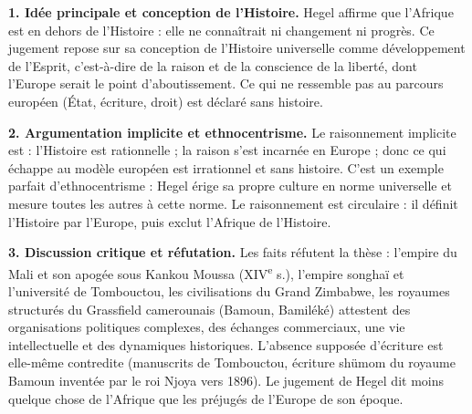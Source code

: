 \documentclass[11pt]{article}
\begin{document}
\begin{corrige}

\textbf{1. Idée principale et conception de l'Histoire.} Hegel affirme que l'Afrique est en dehors de l'Histoire : elle ne connaîtrait ni changement ni progrès. Ce jugement repose sur sa conception de l'Histoire universelle comme développement de l'Esprit, c'est-à-dire de la raison et de la conscience de la liberté, dont l'Europe serait le point d'aboutissement. Ce qui ne ressemble pas au parcours européen (État, écriture, droit) est déclaré sans histoire.

\textbf{2. Argumentation implicite et ethnocentrisme.} Le raisonnement implicite est : l'Histoire est rationnelle ; la raison s'est incarnée en Europe ; donc ce qui échappe au modèle européen est irrationnel et sans histoire. C'est un exemple parfait d'ethnocentrisme : Hegel érige sa propre culture en norme universelle et mesure toutes les autres à cette norme. Le raisonnement est circulaire : il définit l'Histoire par l'Europe, puis exclut l'Afrique de l'Histoire.

\textbf{3. Discussion critique et réfutation.} Les faits réfutent la thèse : l'empire du Mali et son apogée sous Kankou Moussa (XIV\textsuperscript{e} s.), l'empire songhaï et l'université de Tombouctou, les civilisations du Grand Zimbabwe, les royaumes structurés du Grassfield camerounais (Bamoun, Bamiléké) attestent des organisations politiques complexes, des échanges commerciaux, une vie intellectuelle et des dynamiques historiques. L'absence supposée d'écriture est elle-même contredite (manuscrits de Tombouctou, écriture shümom du royaume Bamoun inventée par le roi Njoya vers 1896). Le jugement de Hegel dit moins quelque chose de l'Afrique que les préjugés de l'Europe de son époque.

\end{corrige}
\end{document}
